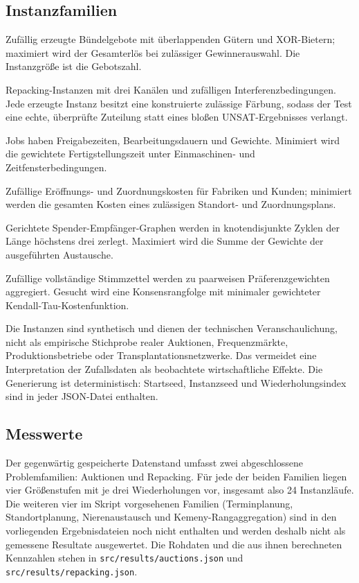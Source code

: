 \documentclass[a4paper,12pt]{article}
\theoremstyle{definition}
\begin{document}
\subsection{Instanzfamilien}
\begin{description}[leftmargin=3.6cm,style=nextline]
\item[Auktionen.] Zufällig erzeugte Bündelgebote mit überlappenden Gütern und XOR-Bietern; maximiert wird der Gesamterlös bei zulässiger Gewinnerauswahl. Die Instanzgröße ist die Gebotszahl.
\item[Frequenzzuteilung.] Repacking-Instanzen mit drei Kanälen und zufälligen Interferenzbedingungen. Jede erzeugte Instanz besitzt eine konstruierte zulässige Färbung, sodass der Test eine echte, überprüfte Zuteilung statt eines bloßen UNSAT-Ergebnisses verlangt.
\item[Terminplanung.] Jobs haben Freigabezeiten, Bearbeitungsdauern und Gewichte. Minimiert wird die gewichtete Fertigstellungszeit unter Einmaschinen- und Zeitfensterbedingungen.
\item[Standortplanung.] Zufällige Eröffnungs- und Zuordnungskosten für Fabriken und Kunden; minimiert werden die gesamten Kosten eines zulässigen Standort- und Zuordnungsplans.
\item[Nierenaustausch.] Gerichtete Spender-Empfänger-Graphen werden in knotendisjunkte Zyklen der Länge höchstens drei zerlegt. Maximiert wird die Summe der Gewichte der ausgeführten Austausche.
\item[Kemeny-Rangaggregation.] Zufällige vollständige Stimmzettel werden zu paarweisen Präferenzgewichten aggregiert. Gesucht wird eine Konsensrangfolge mit minimaler gewichteter Kendall-Tau-Kostenfunktion.
\end{description}

Die Instanzen sind synthetisch und dienen der technischen Veranschaulichung, nicht als empirische Stichprobe realer Auktionen, Frequenzmärkte, Produktionsbetriebe oder Transplantationsnetzwerke. Das vermeidet eine Interpretation der Zufallsdaten als beobachtete wirtschaftliche Effekte. Die Generierung ist deterministisch: Startseed, Instanzseed und Wiederholungsindex sind in jeder JSON-Datei enthalten.

\subsection{Messwerte}
Der gegenwärtig gespeicherte Datenstand umfasst zwei abgeschlossene Problemfamilien: Auktionen und Repacking. Für jede der beiden Familien liegen vier Größenstufen mit je drei Wiederholungen vor, insgesamt also 24 Instanzläufe. Die weiteren vier im Skript vorgesehenen Familien (Terminplanung, Standortplanung, Nierenaustausch und Kemeny-Rangaggregation) sind in den vorliegenden Ergebnisdateien noch nicht enthalten und werden deshalb nicht als gemessene Resultate ausgewertet. Die Rohdaten und die aus ihnen berechneten Kennzahlen stehen in \texttt{src/results/auctions.json} und \texttt{src/results/repacking.json}.
\end{document}
